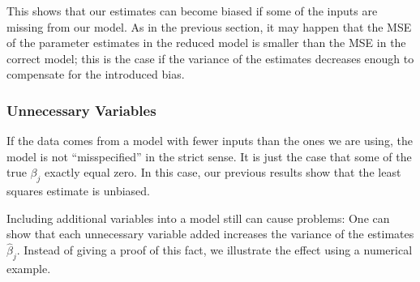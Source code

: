 \documentclass[
  a4paper,
]{article}
\theoremstyle{definition}
\theoremstyle{definition}
\theoremstyle{definition}
\theoremstyle{definition}
\theoremstyle{remark}
\begin{document}
This shows that our estimates can become biased if some of the inputs
are missing from our model. As in the previous section, it may happen
that the MSE of the parameter estimates in the reduced model
is smaller than the MSE in the correct model; this is the case if the
variance of the estimates decreases enough to compensate for the
introduced bias.

\subsubsection{Unnecessary Variables}\label{unnecessary-variables}

If the data comes from a model with fewer inputs than the ones we are using,
the model is not ``misspecified'' in the strict sense. It is just the case that
some of the true \(\beta_j\) exactly equal zero. In this case, our previous
results show that the least squares estimate is unbiased.

Including additional variables into a model still can cause problems:
One can show that each unnecessary variable added increases the variance of the
estimates \(\hat\beta_j\). Instead of giving a proof of this fact,
we illustrate the effect using a numerical example.
\end{document}
